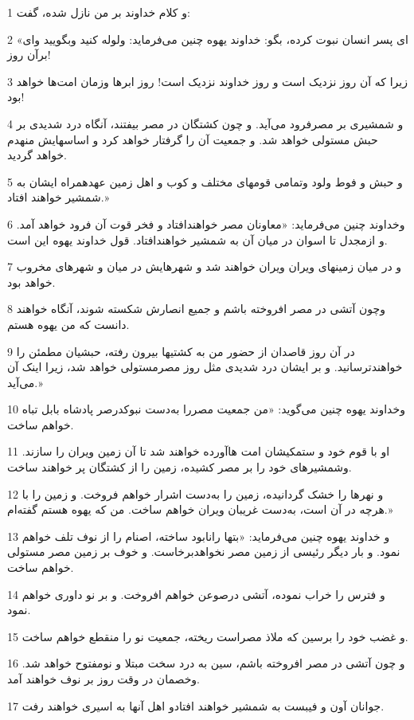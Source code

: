 \par 1 و کلام خداوند بر من نازل شده، گفت:
\par 2 «ای پسر انسان نبوت کرده، بگو: خداوند یهوه چنین می‌فرماید: ولوله کنید وبگویید وای برآن روز!
\par 3 زیرا که آن روز نزدیک است و روز خداوند نزدیک است! روز ابرها وزمان امت‌ها خواهد بود!
\par 4 و شمشیری بر مصرفرود می‌آید. و چون کشتگان در مصر بیفتند، آنگاه درد شدیدی بر حبش مستولی خواهد شد. و جمعیت آن را گرفتار خواهد کرد و اساسهایش منهدم خواهد گردید.
\par 5 و حبش و فوط ولود وتمامی قومهای مختلف و کوب و اهل زمین عهدهمراه ایشان به شمشیر خواهند افتاد.»
\par 6 وخداوند چنین می‌فرماید: «معاونان مصر خواهندافتاد و فخر قوت آن فرود خواهد آمد. و ازمجدل تا اسوان در میان آن به شمشیر خواهندافتاد. قول خداوند یهوه این است.
\par 7 و در میان زمینهای ویران ویران خواهند شد و شهرهایش در میان و شهرهای مخروب خواهد بود.
\par 8 وچون آتشی در مصر افروخته باشم و جمیع انصارش شکسته شوند، آنگاه خواهند دانست که من یهوه هستم.
\par 9 در آن روز قاصدان از حضور من به کشتیها بیرون رفته، حبشیان مطمئن را خواهندترسانید. و بر ایشان درد شدیدی مثل روز مصرمستولی خواهد شد، زیرا اینک آن می‌آید.»
\par 10 وخداوند یهوه چنین می‌گوید: «من جمعیت مصررا به‌دست نبوکدرصر پادشاه بابل تباه خواهم ساخت.
\par 11 او با قوم خود و ستمکیشان امت هاآورده خواهند شد تا آن زمین ویران را سازند. وشمشیرهای خود را بر مصر کشیده، زمین را از کشتگان پر خواهند ساخت.
\par 12 و نهرها را خشک گردانیده، زمین را به‌دست اشرار خواهم فروخت. و زمین را با هرچه در آن است، به‌دست غریبان ویران خواهم ساخت. من که یهوه هستم گفته‌ام.»
\par 13 و خداوند یهوه چنین می‌فرماید: «بتها رانابود ساخته، اصنام را از نوف تلف خواهم نمود. و بار دیگر رئیسی از زمین مصر نخواهدبرخاست. و خوف بر زمین مصر مستولی خواهم ساخت.
\par 14 و فترس را خراب نموده، آتشی درصوعن خواهم افروخت. و بر نو داوری خواهم نمود.
\par 15 و غضب خود را برسین که ملاذ مصراست ریخته، جمعیت نو را منقطع خواهم ساخت.
\par 16 و چون آتشی در مصر افروخته باشم، سین به درد سخت مبتلا و نومفتوح خواهد شد. وخصمان در وقت روز بر نوف خواهند آمد.
\par 17 جوانان آون و فیبست به شمشیر خواهند افتادو اهل آنها به اسیری خواهند رفت.
